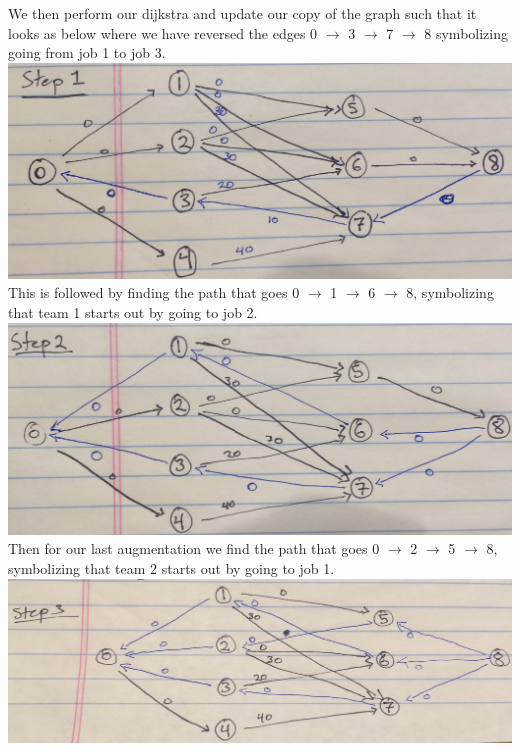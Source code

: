 \documentclass[12pt]{article}
\begin{document}
\newpage
We then perform our dijkstra and update our copy of the graph such that it looks as below where we have
reversed the edges 0 $\rightarrow$ 3 $\rightarrow$ 7 $\rightarrow$ 8 symbolizing going from job 1 to job 3. \\
\includegraphics[width=\textwidth]{ExampleCpart2} \\

This is followed by finding the path that goes 0 $\rightarrow$ 1 $\rightarrow$ 6 $\rightarrow$ 8, symbolizing
that team 1 starts out by going to job 2. \\
\includegraphics[width=\textwidth]{ExampleCpart3} \\
\newpage
Then for our last augmentation we find the path that goes 0 $\rightarrow$ 2 $\rightarrow$ 5 $\rightarrow$ 8,
symbolizing that team 2 starts out by going to job 1. \\
\includegraphics[width=\textwidth]{ExampleCpart4} \\
\end{document}
